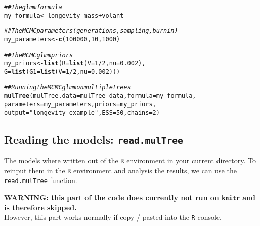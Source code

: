 \documentclass{article}\usepackage[]{graphicx}\usepackage[]{color}
\makeatletter
\newcommand{\hlnum}[1]{\textcolor[rgb]{0.686,0.059,0.569}{#1}}%
\newcommand{\hlstr}[1]{\textcolor[rgb]{0.192,0.494,0.8}{#1}}%
\newcommand{\hlcom}[1]{\textcolor[rgb]{0.678,0.584,0.686}{\textit{#1}}}%
\newcommand{\hlopt}[1]{\textcolor[rgb]{0,0,0}{#1}}%
\newcommand{\hlstd}[1]{\textcolor[rgb]{0.345,0.345,0.345}{#1}}%
\newcommand{\hlkwb}[1]{\textcolor[rgb]{0.69,0.353,0.396}{#1}}%
\newcommand{\hlkwc}[1]{\textcolor[rgb]{0.333,0.667,0.333}{#1}}%
\newcommand{\hlkwd}[1]{\textcolor[rgb]{0.737,0.353,0.396}{\textbf{#1}}}%
\newenvironment{kframe}{%
 \def\at@end@of@kframe{}%
 \ifinner\ifhmode%
  \def\at@end@of@kframe{\end{minipage}}%
  \begin{minipage}{\columnwidth}%
 \fi\fi%
 \def\FrameCommand##1{\hskip\@totalleftmargin \hskip-\fboxsep
 \colorbox{shadecolor}{##1}\hskip-\fboxsep
     \hskip-\linewidth \hskip-\@totalleftmargin \hskip\columnwidth}%
 \MakeFramed {\advance\hsize-\width
   \@totalleftmargin\z@ \linewidth\hsize
   \@setminipage}}%
 {\par\unskip\endMakeFramed%
 \at@end@of@kframe}
\newenvironment{knitrout}{}{} %
\makeatother
\begin{document}
\begin{knitrout}
\color{fgcolor}\begin{kframe}
\begin{alltt}
\hlcom{## The glmm formula}
\hlstd{my_formula} \hlkwb{<-} \hlstd{longevity} \hlopt{~} \hlstd{mass} \hlopt{+} \hlstd{volant}

\hlcom{## The MCMC parameters (generations, sampling, burnin)}
\hlstd{my_parameters} \hlkwb{<-} \hlkwd{c}\hlstd{(}\hlnum{100000}\hlstd{,} \hlnum{10}\hlstd{,} \hlnum{1000}\hlstd{)}

\hlcom{## The MCMCglmm priors}
\hlstd{my_priors} \hlkwb{<-} \hlkwd{list}\hlstd{(}\hlkwc{R} \hlstd{=} \hlkwd{list}\hlstd{(}\hlkwc{V} \hlstd{=} \hlnum{1}\hlopt{/}\hlnum{2}\hlstd{,} \hlkwc{nu} \hlstd{=} \hlnum{0.002}\hlstd{),}
    \hlkwc{G} \hlstd{=} \hlkwd{list}\hlstd{(}\hlkwc{G1} \hlstd{=} \hlkwd{list}\hlstd{(}\hlkwc{V} \hlstd{=} \hlnum{1}\hlopt{/}\hlnum{2}\hlstd{,} \hlkwc{nu} \hlstd{=} \hlnum{0.002}\hlstd{)))}

\hlcom{## Running the MCMCglmm on multiple trees}
\hlkwd{mulTree}\hlstd{(}\hlkwc{mulTree.data} \hlstd{= mulTree_data,} \hlkwc{formula} \hlstd{= my_formula,}
     \hlkwc{parameters} \hlstd{= my_parameters,} \hlkwc{priors} \hlstd{= my_priors,}
     \hlkwc{output} \hlstd{=} \hlstr{"longevity_example"}\hlstd{,} \hlkwc{ESS} \hlstd{=} \hlnum{50}\hlstd{,} \hlkwc{chains} \hlstd{=} \hlnum{2}\hlstd{)}
\end{alltt}
\end{kframe}
\end{knitrout}


\subsection{Reading the models: \texttt{read.mulTree}}
The models where written out of the \texttt{R} environment in your current directory.
To reinput them in the \texttt{R} environment and analysis the results, we can use the \texttt{read.mulTree} function.

\textbf{WARNING: this part of the code does currently not run on \texttt{knitr} and is therefore skipped.}\\
However, this part works normally if copy / pasted into the \texttt{R} console.
\end{document}
